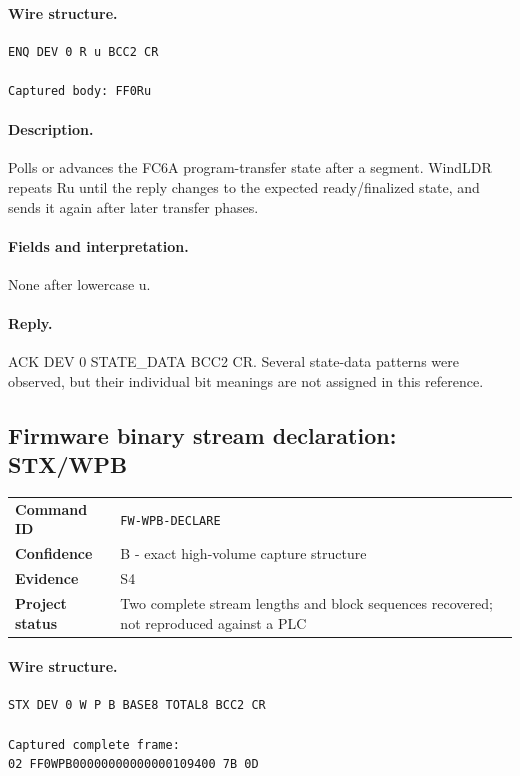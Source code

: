 \documentclass[10pt,letterpaper]{article}
\begin{document}
\paragraph{Wire structure.}
\begin{Verbatim}[breaklines=true,breakanywhere=true,fontsize=\small]
ENQ DEV 0 R u BCC2 CR

Captured body: FF0Ru
\end{Verbatim}
\paragraph{Description.} Polls or advances the FC6A program-transfer state after a segment. WindLDR repeats Ru until the reply changes to the expected ready/finalized state, and sends it again after later transfer phases.
\paragraph{Fields and interpretation.}
\begin{description}[style=nextline,leftmargin=3.2cm,labelwidth=3.0cm,font=\normalfont\bfseries]
\item[Request payload] None after lowercase u.
\end{description}
\paragraph{Reply.} ACK DEV 0 STATE\_DATA BCC2 CR. Several state-data patterns were observed, but their individual bit meanings are not assigned in this reference.

\subsection{Firmware binary stream declaration: STX/WPB}
\begin{tabularx}{\textwidth}{@{}>{\bfseries}p{2.8cm}X@{}}
Command ID & \texttt{FW-WPB-DECLARE} \\
Confidence & B - exact high-volume capture structure \\
Evidence & S4 \\
Project status & Two complete stream lengths and block sequences recovered; not reproduced against a PLC \\
\end{tabularx}
\vspace{0.35em}
\paragraph{Wire structure.}
\begin{Verbatim}[breaklines=true,breakanywhere=true,fontsize=\small]
STX DEV 0 W P B BASE8 TOTAL8 BCC2 CR

Captured complete frame:
02 FF0WPB00000000000000109400 7B 0D
\end{Verbatim}
\end{document}
